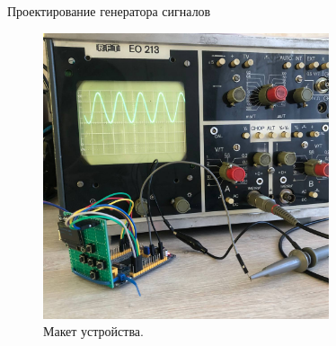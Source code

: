 \documentclass[10pt]{beamer}
\begin{document}
\begin{frame}{Проектирование генератора сигналов}
  \begin{figure}
  \includegraphics[width=0.75\textwidth]{m2}
  \caption*{Макет устройства.}
  \end{figure}
\end{frame}
\end{document}
